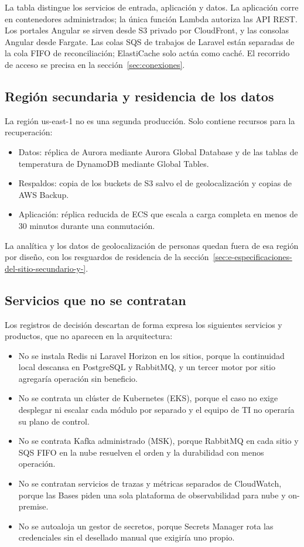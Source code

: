 La tabla distingue los servicios de entrada, aplicación y datos. La aplicación corre en contenedores administrados; la única función Lambda autoriza las API REST. Los portales Angular se sirven desde S3 privado por CloudFront, y las consolas Angular desde Fargate. Las colas SQS de trabajos de Laravel están separadas de la cola FIFO de reconciliación; ElastiCache solo actúa como caché. El recorrido de acceso se precisa en la sección~\ref{sec:conexiones}.

\subsection{Región secundaria y residencia de los datos}

La región us-east-1 no es una segunda producción. Solo contiene recursos para la recuperación:

\begin{itemize}
  \item Datos: réplica de Aurora mediante Aurora Global Database y de las tablas de temperatura de DynamoDB mediante Global Tables.
  \item Respaldos: copia de los buckets de S3 salvo el de geolocalización y copias de AWS Backup.
  \item Aplicación: réplica reducida de ECS que escala a carga completa en menos de 30 minutos durante una conmutación.
\end{itemize}

La analítica y los datos de geolocalización de personas quedan fuera de esa región por diseño, con los resguardos de residencia de la sección~\ref{sec:e-especificaciones-del-sitio-secundario-y-}.

\subsection{Servicios que no se contratan}

Los registros de decisión descartan de forma expresa los siguientes servicios y productos, que no aparecen en la arquitectura:

\begin{itemize}
  \item No se instala Redis ni Laravel Horizon en los sitios, porque la continuidad local descansa en PostgreSQL y RabbitMQ, y un tercer motor por sitio agregaría operación sin beneficio.
  \item No se contrata un clúster de Kubernetes (EKS), porque el caso no exige desplegar ni escalar cada módulo por separado y el equipo de TI no operaría su plano de control.
  \item No se contrata Kafka administrado (MSK), porque RabbitMQ en cada sitio y SQS FIFO en la nube resuelven el orden y la durabilidad con menos operación.
  \item No se contratan servicios de trazas y métricas separados de CloudWatch, porque las Bases piden una sola plataforma de observabilidad para nube y on-premise.
  \item No se autoaloja un gestor de secretos, porque Secrets Manager rota las credenciales sin el desellado manual que exigiría uno propio.
\end{itemize}

